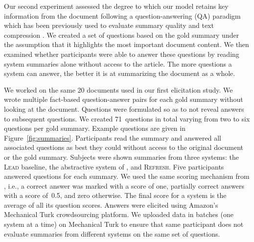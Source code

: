 \documentclass[11pt,a4paper]{article}
\newcommand\refresh{\textsc{Refresh}}
\begin{document}
Our second experiment assessed the degree to which our model retains
key information from the document following a question-answering (QA)
paradigm which has been previously used to evaluate summary quality
and text compression \cite{MorrisKA92,Mani:1999,Clarke:Lapata:2010}.
We created a set of questions based on the gold summary under the
assumption that it highlights the most important document content. We
then examined whether participants were able to answer these questions
by reading system summaries alone without access to the article. The
more questions a system can answer, the better it is at summarizing
the document as a whole.






We worked on the same 20 documents used in our first elicitation
study. We wrote multiple fact-based question-answer pairs for each
gold summary without looking at the document. Questions were
formulated so as to not reveal answers to subsequent questions.  We
created 71~questions in total varying from two to six questions per
gold summary. Example questions are given in
Figure~\ref{fig:summaries}. Participants read the summary and answered
all associated questions as best they could without access to the
original document or the gold summary.  Subjects were shown summaries
from three systems: the \textsc{Lead} baseline, the abstractive system
of , and \refresh. Five participants answered
questions for each summary. We used the same scoring mechanism from
, i.e., a correct answer was marked with a
score of one, partially correct answers with a score of~0.5, and zero
otherwise. The final score for a system is the average of all its
question scores. Answers were elicited using Amazon's Mechanical Turk
crowdsourcing platform. We uploaded data in batches (one system at a
time) on Mechanical Turk to ensure that same participant does not
evaluate summaries from different systems on the same set of
questions.
\end{document}
